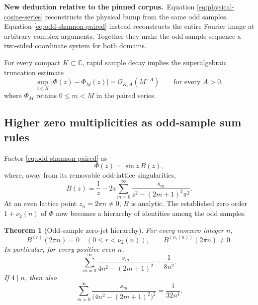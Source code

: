 \documentclass[11pt,oneside]{article}
\newtheorem{theorem}{Theorem}[section]
\theoremstyle{definition}
\theoremstyle{remark}
\newcommand{\C}{\mathbb C}
\newcommand{\vtwo}{\nu_2}
\newcommand{\bigO}{\mathcal O}
\newcommand{\1}{\mathbf 1}
\newcommand{\newresult}{\textcolor{newgreen}{\textbf{New deduction relative to the pinned corpus.}}\ }
\begin{document}
\newresult Equation \eqref{eq:physical-cosine-series} reconstructs the
physical bump from the same odd samples.  Equation
\eqref{eq:odd-shannon-paired} instead reconstructs the entire Fourier image
at arbitrary complex arguments.  Together they make the odd sample sequence
a two-sided coordinate system for both domains.

For every compact $K\subset\C$, rapid sample decay implies the superalgebraic
truncation estimate
\begin{equation}
 \sup_{z\in K}|\Phi(z)-\Phi_M(z)|=\bigO_{K,A}(M^{-A})
 \qquad\text{for every }A>0,                             \label{eq:shannon-superalgebraic}
\end{equation}
where $\Phi_M$ retains $0\le m<M$ in the paired series.

\subsection{Higher zero multiplicities as odd-sample sum rules}

Factor \eqref{eq:odd-shannon-paired} as
\begin{equation}
 \Phi(z)=\sin z\,B(z),                                   \label{eq:Phi-sin-B}
\end{equation}
where, away from its removable odd-lattice singularities,
\begin{equation}
 B(z)=\frac1z-2z\sum_{m=0}^\infty
 \frac{s_m}{z^2-(2m+1)^2\pi^2}.                          \label{eq:B-definition}
\end{equation}
At an even lattice point $z_n=2\pi n\ne0$, $B$ is analytic.  The established
zero order $1+\vtwo(n)$ of $\Phi$ now becomes a hierarchy of identities among
the odd samples.

\begin{theorem}[Odd-sample zero-jet hierarchy]
\label{thm:sample-jet-hierarchy}
For every nonzero integer $n$,
\begin{equation}
 B^{(r)}(2\pi n)=0
 \quad(0\le r<\vtwo(n)),
 \qquad
 B^{(\vtwo(n))}(2\pi n)\ne0.                             \label{eq:B-jet-hierarchy}
\end{equation}
In particular, for every positive even $n$,
\begin{equation}
 \boxed{\displaystyle
 \sum_{m=0}^\infty
 \frac{s_m}{4n^2-(2m+1)^2}=\frac1{8n^2}.}               \label{eq:sample-sum-rule-1}
\end{equation}
If $4\mid n$, then also
\begin{equation}
 \boxed{\displaystyle
 \sum_{m=0}^\infty
 \frac{s_m}{\bigl(4n^2-(2m+1)^2\bigr)^2}
 =\frac1{32n^4}.}                                       \label{eq:sample-sum-rule-2}
\end{equation}
\end{theorem}
\end{document}
